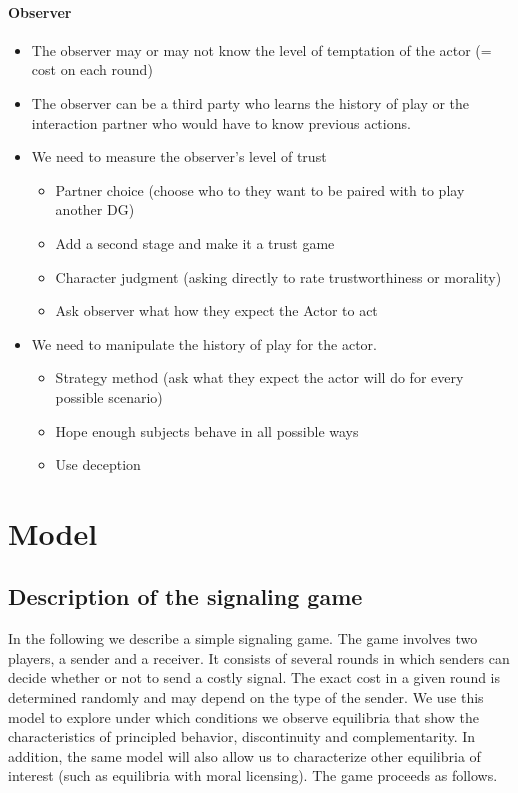 \documentclass[11pt]{article}
\theoremstyle{plainCl1}
\begin{document}
\paragraph{Observer}
\begin{itemize}
    \item The observer may or may not know the level of temptation of the actor (= cost on each round)
    \item The observer can be a third party who learns the history of play or the interaction partner who would have to know previous actions. 
    \item We need to measure the observer's level of trust
    	\begin{itemize}
	\item Partner choice (choose who to they want to be paired with to play another DG)
	\item Add a second stage and make it a trust game
    	\item Character judgment (asking directly to rate trustworthiness or morality)
	\item Ask observer what how they expect the Actor to act
    	\end{itemize}
    \item We need to manipulate the history of play for the actor. 
    	\begin{itemize}
	\item Strategy method (ask what they expect the actor will do for every possible scenario)
	\item Hope enough subjects behave in all possible ways
    	\item Use deception
    	\end{itemize}
\end{itemize}


\section{Model}

\subsection{Description of the signaling game}


In the following we describe a simple signaling game. The game involves two players, a sender and a receiver. It consists of several rounds in which senders can decide whether or not to send a costly signal. The exact cost in a given round is determined randomly and may depend on the type of the sender. We use this model to explore under which conditions we observe equilibria that show the characteristics of principled behavior, discontinuity and complementarity. In addition, the same model will also allow us to characterize other equilibria of interest (such as equilibria with moral licensing).
The game proceeds as follows. 
\end{document}

